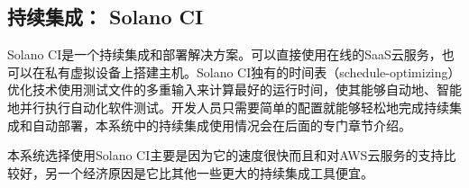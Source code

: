 \subsection{持续集成： Solano CI}
Solano CI是一个持续集成和部署解决方案。可以直接使用在线的SaaS云服务，也可以在私有虚拟设备上搭建主机。Solano CI独有的时间表（schedule-optimizing）优化技术使用测试文件的多重输入来计算最好的运行时间，使其能够自动地、智能地并行执行自动化软件测试。开发人员只需要简单的配置就能够轻松地完成持续集成和自动部署，本系统中的持续集成使用情况会在后面的专门章节介绍。

本系统选择使用Solano CI主要是因为它的速度很快而且和对AWS云服务的支持比较好，另一个经济原因是它比其他一些更大的持续集成工具便宜。

